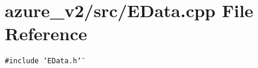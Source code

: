 \section{azure\_\-v2/src/EData.cpp File Reference}
\label{EData_8cpp}
{\tt \#include \char`\"{}EData.h\char`\"{}}\par
